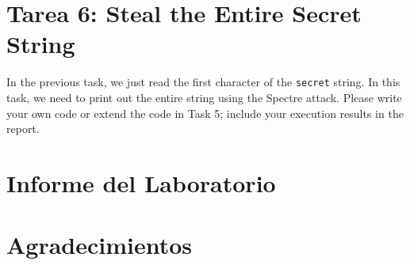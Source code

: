 \section{Tarea 6: Steal the Entire Secret String}

In the previous task, we  just read the first character of the \texttt{secret}
string. In this task, we need to print out the entire string using the 
Spectre attack. Please write your own code or extend the code in Task 5; include your
execution results in the report.


\section{Informe del Laboratorio}




\section*{Agradecimientos}






\def\baselinestretch{1}





